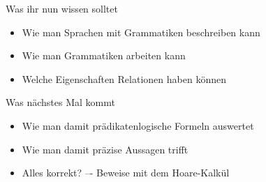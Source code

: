 




%

%

\begin{frame}	
	\begin{block}{Was ihr nun wissen solltet}
		\begin{itemize}
			\item Wie man Sprachen mit Grammatiken beschreiben kann
			\item Wie man Grammatiken arbeiten kann
			\item Welche Eigenschaften Relationen haben können
		\end{itemize}
	\end{block}
	
	\begin{block}{Was nächstes Mal kommt}
		\begin{itemize}
			\item Wie man damit prädikatenlogische Formeln auswertet
			\item Wie man damit präzise Aussagen trifft
			\item Alles korrekt? –- Beweise mit dem Hoare-Kalkül
		\end{itemize}
	\end{block}
\end{frame}

